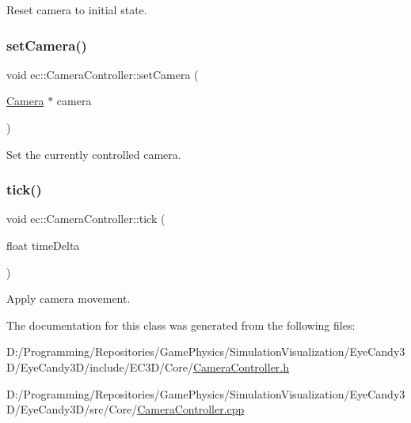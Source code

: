 Reset camera to initial state. 

\mbox{\label{classec_1_1_camera_controller_a74d3b80913b69dce0bae61a651c3b49b}} 
\subsubsection{\texorpdfstring{set\+Camera()}{setCamera()}}
{\footnotesize\ttfamily void ec\+::\+Camera\+Controller\+::set\+Camera (\begin{DoxyParamCaption}\item[{\mbox{\hyperlink{classec_1_1_camera}{Camera}} $\ast$}]{camera }\end{DoxyParamCaption})}



Set the currently controlled camera. 

\mbox{\label{classec_1_1_camera_controller_a82055ad6c8797937a8ec17234ab08758}} 
\subsubsection{\texorpdfstring{tick()}{tick()}}
{\footnotesize\ttfamily void ec\+::\+Camera\+Controller\+::tick (\begin{DoxyParamCaption}\item[{float}]{time\+Delta }\end{DoxyParamCaption})}



Apply camera movement. 



The documentation for this class was generated from the following files\+:\begin{DoxyCompactItemize}
\item 
D\+:/\+Programming/\+Repositories/\+Game\+Physics/\+Simulation\+Visualization/\+Eye\+Candy3\+D/\+Eye\+Candy3\+D/include/\+E\+C3\+D/\+Core/\mbox{\hyperlink{_camera_controller_8h}{Camera\+Controller.\+h}}\item 
D\+:/\+Programming/\+Repositories/\+Game\+Physics/\+Simulation\+Visualization/\+Eye\+Candy3\+D/\+Eye\+Candy3\+D/src/\+Core/\mbox{\hyperlink{_camera_controller_8cpp}{Camera\+Controller.\+cpp}}\end{DoxyCompactItemize}
